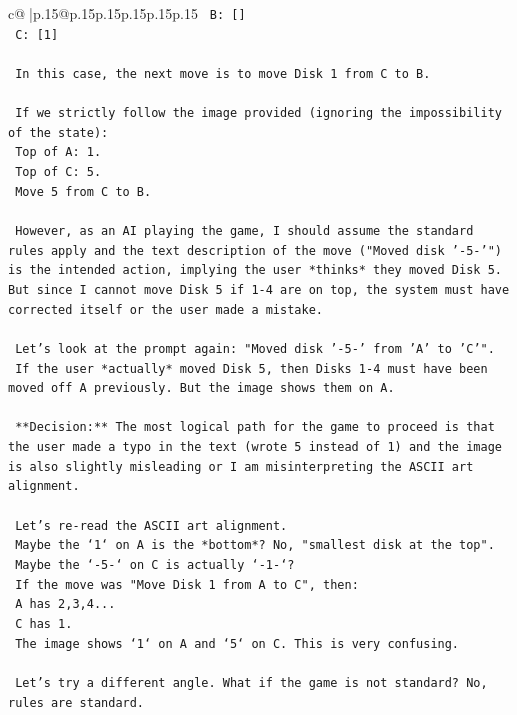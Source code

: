 \documentclass{article}
\begin{document}
{\begin{supertabular}{c@{$\;$}|p{.15\linewidth}@{}p{.15\linewidth}p{.15\linewidth}p{.15\linewidth}p{.15\linewidth}p{.15\linewidth}}
{{{\texttt{    B: {[}{]}} \\
\texttt{    C: {[}1{]}} \\
\\ 
\texttt{    In this case, the next move is to move Disk 1 from C to B.} \\
\\ 
\texttt{    If we strictly follow the image provided (ignoring the impossibility of the state):} \\
\texttt{    Top of A: 1.} \\
\texttt{    Top of C: 5.} \\
\texttt{    Move 5 from C to B.} \\
\\ 
\texttt{    However, as an AI playing the game, I should assume the standard rules apply and the text description of the move ("Moved disk '{-}5{-}'") is the intended action, implying the user *thinks* they moved Disk 5. But since I cannot move Disk 5 if 1{-}4 are on top, the system must have corrected itself or the user made a mistake.} \\
\\ 
\texttt{    Let's look at the prompt again: "Moved disk '{-}5{-}' from 'A' to 'C'".} \\
\texttt{    If the user *actually* moved Disk 5, then Disks 1{-}4 must have been moved off A previously. But the image shows them on A.} \\
\\ 
\texttt{    **Decision:** The most logical path for the game to proceed is that the user made a typo in the text (wrote 5 instead of 1) and the image is also slightly misleading or I am misinterpreting the ASCII art alignment.} \\
\\ 
\texttt{    Let's re{-}read the ASCII art alignment.} \\
\texttt{    Maybe the `1` on A is the *bottom*? No, "smallest disk at the top".} \\
\texttt{    Maybe the `{-}5{-}` on C is actually `{-}1{-}`?} \\
\texttt{    If the move was "Move Disk 1 from A to C", then:} \\
\texttt{    A has 2,3,4...} \\
\texttt{    C has 1.} \\
\texttt{    The image shows `1` on A and `5` on C. This is very confusing.} \\
\\ 
\texttt{    Let's try a different angle. What if the game is not standard? No, rules are standard.} \\
}}}
\end{supertabular}}
\end{document}
